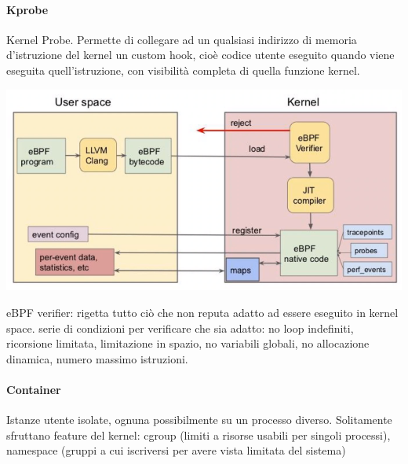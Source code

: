 \documentclass[10pt]{book}
\begin{document}
\paragraph{Kprobe} Kernel Probe. Permette di collegare ad un qualsiasi indirizzo di memoria d'istruzione del kernel un custom hook, cioè codice utente eseguito quando viene eseguita quell'istruzione, con visibilità completa di quella funzione kernel.
\begin{center}
	\includegraphics[scale=0.75]{ebf.png}
\end{center}
eBPF verifier: rigetta tutto ciò che non reputa adatto ad essere eseguito in kernel space. serie di condizioni per verificare che sia adatto: no loop indefiniti, ricorsione limitata, limitazione in spazio, no variabili globali, no allocazione dinamica, numero massimo istruzioni.
\paragraph{Container} Istanze utente isolate, ognuna possibilmente su un processo diverso. Solitamente sfruttano feature del kernel: cgroup (limiti a risorse usabili per singoli processi), namespace (gruppi a cui iscriversi per avere vista limitata del sistema)
\end{document}
